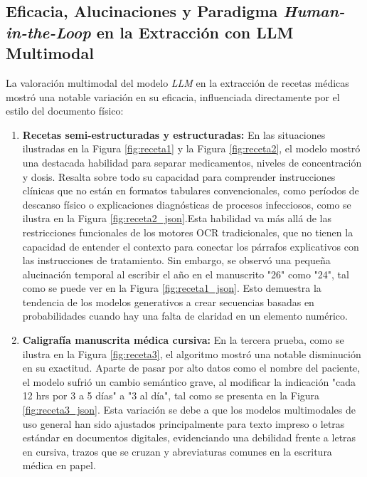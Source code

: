 \subsection{Eficacia, Alucinaciones y Paradigma \emph{Human-in-the-Loop} en la Extracción con LLM Multimodal}
\label{subsec:discusion_llm}

La valoración multimodal del modelo \emph{LLM} en la extracción de recetas médicas mostró una notable variación en su eficacia, influenciada directamente por el estilo del documento físico:

\begin{enumerate}
    \item \textbf{Recetas semi-estructuradas y estructuradas:} En las situaciones ilustradas en la Figura \ref{fig:receta1} y la Figura \ref{fig:receta2}, el modelo mostró una destacada habilidad para separar medicamentos, niveles de concentración y dosis. Resalta sobre todo su capacidad para comprender instrucciones clínicas que no están en formatos tabulares convencionales, como períodos de descanso físico o explicaciones diagnósticas de procesos infecciosos, como se ilustra en la Figura \ref{fig:receta2_json}.Esta habilidad va más allá de las restricciones funcionales de los motores {OCR} tradicionales, que no tienen la capacidad de entender el contexto para conectar los párrafos explicativos con las instrucciones de tratamiento. Sin embargo, se observó una pequeña alucinación temporal al escribir el año en el manuscrito "26" como "24", tal como se puede ver en la Figura \ref{fig:receta1_json}. Esto demuestra la tendencia de los modelos generativos a crear secuencias basadas en probabilidades cuando hay una falta de claridad en un elemento numérico.
    
    \item \textbf{Caligrafía manuscrita médica cursiva:} En la tercera prueba, como se ilustra en la Figura \ref{fig:receta3}, el algoritmo mostró una notable disminución en su exactitud. Aparte de pasar por alto datos como el nombre del paciente, el modelo sufrió un cambio semántico grave, al modificar la indicación "cada 12 hrs por 3 a 5 días" a "3 al día", tal como se presenta en la Figura \ref{fig:receta3_json}. Esta variación se debe a que los modelos multimodales de uso general han sido ajustados principalmente para texto impreso o letras estándar en documentos digitales, evidenciando una debilidad frente a letras en cursiva, trazos que se cruzan y abreviaturas comunes en la escritura médica en papel.
\end{enumerate}

